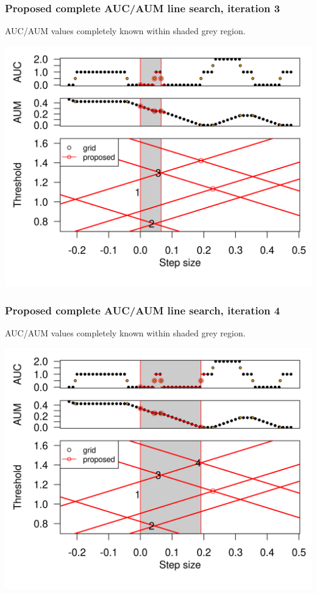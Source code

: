\begin{frame}
  \frametitle{Proposed complete AUC/AUM line search, iteration 3}
AUC/AUM values completely known within shaded grey region.


  \includegraphics[width=\textwidth]{figure-line-search-example-3}


\end{frame}


\begin{frame}
  \frametitle{Proposed complete AUC/AUM line search, iteration 4}
AUC/AUM values completely known within shaded grey region.


  \includegraphics[width=\textwidth]{figure-line-search-example-4}


\end{frame}


